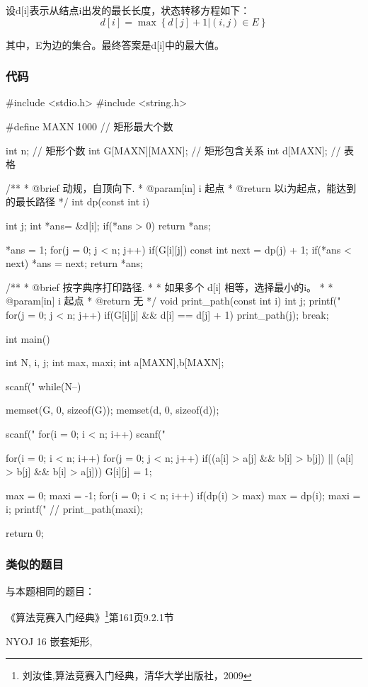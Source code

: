 设d[i]表示从结点i出发的最长长度，状态转移方程如下：
$$d[i]=\max\left\{d[j]+1|(i,j) \in E\right\}$$

其中，E为边的集合。最终答案是d[i]中的最大值。

\subsubsection{代码}
\begin{Codex}[label=embedded_rectangles.c]
#include <stdio.h>
#include <string.h>

#define MAXN 1000 // 矩形最大个数

int n; // 矩形个数
int G[MAXN][MAXN]; // 矩形包含关系
int d[MAXN]; // 表格

/**
 * @brief 动规，自顶向下.
 * @param[in] i 起点
 * @return 以i为起点，能达到的最长路径
 */
int dp(const int i) {
    int j;
    int *ans= &d[i];
    if(*ans > 0) return *ans;

    *ans = 1;
    for(j = 0; j < n; j++) if(G[i][j]) {
        const int next = dp(j) + 1;
        if(*ans < next) *ans = next;
    }
    return *ans;
}

/**
 * @brief 按字典序打印路径.
 *
 * 如果多个 d[i] 相等，选择最小的i。
 *
 * @param[in] i 起点
 * @return 无
 */
void print_path(const int i) {
    int j;
    printf("%
    for(j = 0; j < n; j++) if(G[i][j] && d[i] == d[j] + 1) {
        print_path(j);
        break;
    }
}

int main() {
    int N, i, j;
    int max, maxi;
    int a[MAXN],b[MAXN];

    scanf("%
    while(N--) {
        memset(G, 0, sizeof(G));
        memset(d, 0, sizeof(d));

        scanf("%
        for(i = 0; i < n; i++) scanf("%

        for(i = 0; i < n; i++)
            for(j = 0; j < n; j++)
                if((a[i] > a[j] && b[i] > b[j]) ||
                    (a[i] > b[j] && b[i] > a[j])) G[i][j] = 1;

        max = 0;
        maxi = -1;
        for(i = 0; i < n; i++) if(dp(i) > max) {
            max = dp(i);
            maxi = i;
        }
        printf("%
        // print_path(maxi);
    }
    return 0;
}
\end{Codex}

\subsubsection{类似的题目}
与本题相同的题目：
\begindot
\item 《算法竞赛入门经典》\footnote{刘汝佳,算法竞赛入门经典，清华大学出版社，2009}第161页9.2.1节
\item  NYOJ 16 嵌套矩形, 
\myenddot

